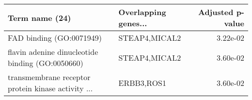 \begin{tabular}{llr}
\toprule
                                    Term name (24) & Overlapping genes... &  Adjusted p-value \\
\midrule
                          FAD binding (GO:0071949) &        STEAP4,MICAL2 &          3.22e-02 \\
  flavin adenine dinucleotide binding (GO:0050660) &        STEAP4,MICAL2 &          3.60e-02 \\
transmembrane receptor protein kinase activity ... &           ERBB3,ROS1 &          3.60e-02 \\
\bottomrule
\end{tabular}
